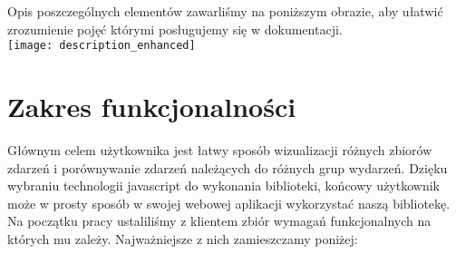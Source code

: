 \documentclass[polish,12pt]{aghthesis}
\begin{document}
Opis poszczególnych elementów zawarliśmy na poniższym obrazie, aby ułatwić zrozumienie pojęć którymi posługujemy się w dokumentacji.\\

\texttt{[image: description\_enhanced]}
\pagebreak
\section{Zakres funkcjonalności}
\label{sec:zakres-funkcjonalnosci}

Głównym celem użytkownika jest łatwy sposób wizualizacji różnych zbiorów zdarzeń i porównywanie zdarzeń należących do różnych grup wydarzeń. Dzięku wybraniu technologii javascript do wykonania biblioteki, końcowy użytkownik może w prosty sposób w swojej webowej aplikacji wykorzystać naszą bibliotekę.
\\

Na początku pracy ustaliliśmy z klientem zbiór wymagań funkcjonalnych na których mu zależy. Najważniejsze z nich zamieszczamy poniżej:
\end{document}
